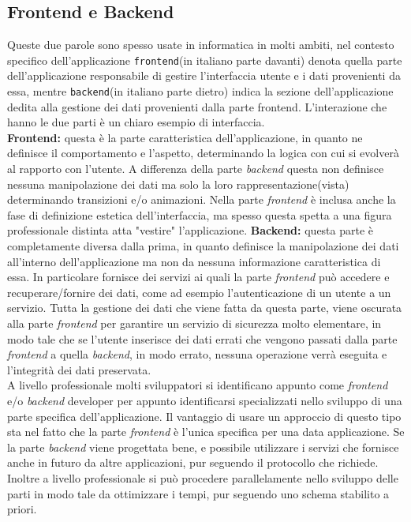 \subsection{Frontend e Backend}
Queste due parole sono spesso usate in informatica in molti ambiti, nel contesto specifico dell'applicazione \texttt{frontend}(in italiano parte davanti) denota quella parte dell'applicazione responsabile di gestire l'interfaccia utente e i dati provenienti da essa, mentre \texttt{backend}(in italiano parte dietro) indica la sezione dell'applicazione dedita alla gestione dei dati provenienti dalla parte frontend. L'interazione che hanno le due parti è un chiaro esempio di interfaccia.\\
\textbf{Frontend:} questa è la parte caratteristica dell'applicazione, in quanto ne definisce il comportamento e l'aspetto, determinando la logica con cui si evolverà al rapporto con l'utente. A differenza della parte \emph{backend} questa non definisce nessuna manipolazione dei dati ma solo la loro rappresentazione(vista) determinando transizioni e/o animazioni.
Nella parte \emph{frontend} è inclusa anche la fase di definizione estetica dell'interfaccia, ma spesso questa spetta a una figura professionale distinta atta "vestire" l'applicazione.
\textbf{Backend:} questa parte è completamente diversa dalla prima, in quanto definisce la manipolazione dei dati all'interno dell'applicazione ma non da nessuna informazione caratteristica di essa. In particolare fornisce dei servizi ai quali la parte \emph{frontend} può accedere e recuperare/fornire dei dati, come ad esempio l'autenticazione di un utente a un servizio. Tutta la gestione dei dati che viene fatta da questa parte, viene oscurata alla parte \emph{frontend} per garantire un servizio di sicurezza molto elementare, in modo tale che se l'utente inserisce dei dati errati che vengono passati dalla parte \emph{frontend} a quella \emph{backend}, in modo errato, nessuna operazione verrà eseguita e l'integrità dei dati preservata.\\

A livello professionale molti sviluppatori si identificano appunto come \emph{frontend} e/o \emph{backend} developer per appunto identificarsi specializzati nello sviluppo di una parte specifica dell'applicazione.
Il vantaggio di usare un approccio di questo tipo sta nel fatto che la parte \emph{frontend} è l'unica specifica per una data applicazione. Se la parte \emph{backend} viene progettata bene, e possibile utilizzare i servizi che fornisce anche in futuro da altre applicazioni, pur seguendo il protocollo che richiede. Inoltre a livello professionale si può procedere parallelamente nello sviluppo delle parti in modo tale da ottimizzare i tempi, pur seguendo uno schema stabilito a priori.\\

